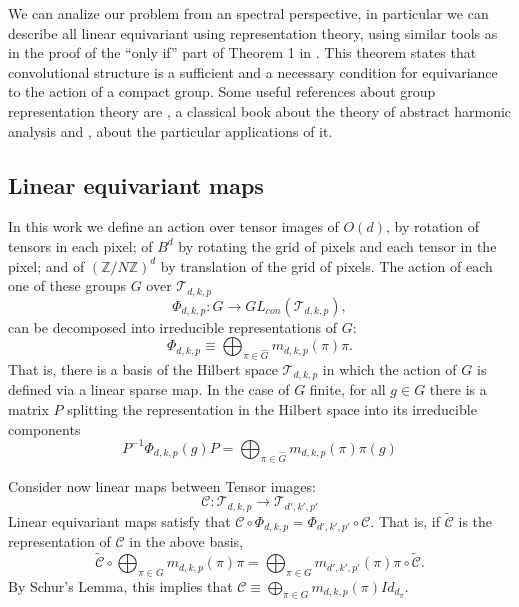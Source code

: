 \documentclass{article}
\theoremstyle{definition}
\begin{document}
We can analize our problem from an spectral perspective, in particular we can describe all linear equivariant using representation theory, using similar tools as in the proof of the ``only if'' part of Theorem 1 in \cite{ref3}. This theorem states that convolutional structure is a sufficient and a necessary condition for equivariance to the action of a compact group. Some useful references about group representation theory are \cite{ref5}, a classical book about the theory of abstract harmonic analysis and \cite{ref6}, about the particular applications of it.

\subsection{Linear equivariant maps}
In this work we define an action  over tensor images of $O(d)$, by rotation of tensors in each pixel; of $B^d$ by rotating the grid of pixels and each tensor in the pixel; and of $(\mathbb{Z}/N \mathbb{Z})^d$ by translation of the grid of pixels. The action of each one of these groups $G$ over $\mathcal{T}_{d,k,p}$
\begin{equation}
    \Phi_{d,k,p}: G \to GL_{con} (\mathcal{T}_{d,k,p}),
\end{equation}
can be decomposed into irreducible representations of $G$:
\begin{equation}
    \Phi_{d,k,p} \equiv \bigoplus_{\pi \in \hat{G}} m_{d,k,p}(\pi) \pi.
\end{equation}
That is, there is a basis of the Hilbert space $\mathcal{T}_{d,k,p}$ in which the action of $G$ is defined via a linear sparse map. In the case of $G$ finite, for all $g\in G$ there is a matrix $P$ splitting the representation in the Hilbert space into its irreducible components
\begin{equation}
    P^{-1} \Phi_{d,k,p}(g)P=\bigoplus_{\pi \in \hat{G}} m_{d,k,p}(\pi) \pi(g)
\end{equation}

Consider now linear maps between Tensor images:
\begin{equation}
    \mathcal{C}:\mathcal{T}_{d,k,p} \to \mathcal{T}_{d',k',p'}
\end{equation}
Linear equivariant maps satisfy that  $\mathcal{C}\circ \Phi_{d,k,p} = \Phi_{d',k',p'} \circ \mathcal{C}$. That is, if $\tilde{\mathcal{C}}$ is the representation of $\mathcal{C}$ in the above basis,
\begin{equation}
    \tilde{\mathcal{C}} \circ \bigoplus_{\pi \in G} m_{d,k,p}(\pi) \pi = \bigoplus_{\pi \in G} m_{d',k',p'}(\pi) \pi \circ \tilde{\mathcal{C}}.
\end{equation}
By Schur's Lemma, this implies that $\mathcal{C}\equiv \bigoplus_{\pi \in G} m_{d,k,p}(\pi) Id_{d_\pi}$.
\end{document}
